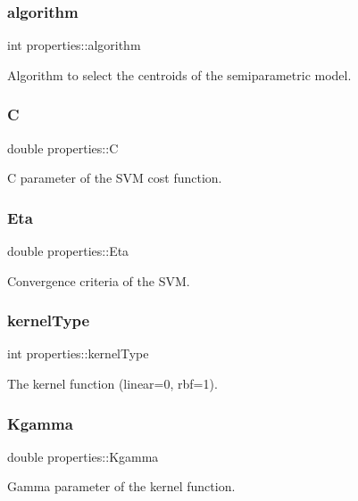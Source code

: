 \subsubsection{\texorpdfstring{algorithm}{algorithm}}
{\ttfamily int properties\+::algorithm}

Algorithm to select the centroids of the semiparametric model. \hypertarget{structproperties_a3b98814395b295db30f029e5e67ae9c9}{}\label{structproperties_a3b98814395b295db30f029e5e67ae9c9} 
\subsubsection{\texorpdfstring{C}{C}}
{\ttfamily double properties\+::C}

C parameter of the S\+VM cost function. \hypertarget{structproperties_abd91deb543a31a6a1f75892af7cf95c8}{}\label{structproperties_abd91deb543a31a6a1f75892af7cf95c8} 
\subsubsection{\texorpdfstring{Eta}{Eta}}
{\ttfamily double properties\+::\+Eta}

Convergence criteria of the S\+VM. \hypertarget{structproperties_a2cb295bd30c81b5bec52b79e67106881}{}\label{structproperties_a2cb295bd30c81b5bec52b79e67106881} 
\subsubsection{\texorpdfstring{kernel\+Type}{kernelType}}
{\ttfamily int properties\+::kernel\+Type}

The kernel function (linear=0, rbf=1). \hypertarget{structproperties_aab9c0195a446f08fc782701750ddb6ac}{}\label{structproperties_aab9c0195a446f08fc782701750ddb6ac} 
\subsubsection{\texorpdfstring{Kgamma}{Kgamma}}
{\ttfamily double properties\+::\+Kgamma}

Gamma parameter of the kernel function. \hypertarget{structproperties_a42219768dd35e1ab628e1785759df400}{}\label{structproperties_a42219768dd35e1ab628e1785759df400} 
